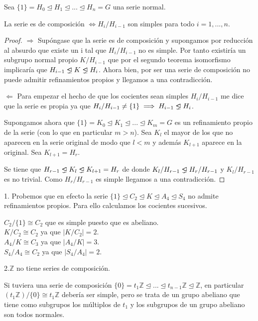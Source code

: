 \begin{nth}
Sea $\{1\} = H_0 \trianglelefteq H_1 \trianglelefteq ... \trianglelefteq H_n = G$ una serie normal. 

La serie es de composición $\iff H_i/H_{i-1}$ son simples para todo $i = 1,...,n$.
\end{nth}
\begin{proof}
$\Rightarrow$ Supóngase que la serie es de composición y supongamos por reducción al absurdo que existe un i tal que $H_i/H_{i-1}$ no es simple. Por tanto existiría un subgrupo normal propio $K/H_{i-1}$ que por el segundo teorema isomorfismo implicaría que $H_{i-1} \propernormal K \propernormal H_{i}$. Ahora bien, por ser una serie de composición no puede admitir refinamientos propios y llegamos a una contradicción.

$\Leftarrow$ Para empezar el hecho de que los cocientes sean simples $H_i/H_{i-1}$ me dice que la serie es propia ya que $H_i/H_{i-1} \neq \{1\} \implies H_{i-1} \propernormal H_i$.

Supongamos ahora que $\{1\} = K_0 \trianglelefteq K_1 \trianglelefteq ... \trianglelefteq K_m = G$ es un refinamiento propio de la serie (con lo que en particular $m > n$). Sea $K_l$ el mayor de los que no aparecen en la serie original de modo que $l < m$ y además $K_{l+1}$ aparece en la original. Sea $K_{l+1} = H_r$. 

Se tiene que $H_{r-1} \propernormal K_l \propernormal K_{l+1} = H_r$ de donde $K_l/H_{r-1} \propernormal H_r/H_{r-1}$ y $K_l/H_{r-1}$ es no trivial. Como $H_r/H_{r-1}$ es simple llegamos a una contradicción.
\end{proof}

\begin{ejemplo}
1. Probemos que en efecto la serie $\{1\} \trianglelefteq C_2 \trianglelefteq K \trianglelefteq A_4 \trianglelefteq S_4$ no admite refinamientos propios. Para ello calculamos los cocientes sucesivos. 

$C_2/\{1\} \cong C_2$ que es simple puesto que es abeliano.\\
$K/C_2 \cong C_2$ ya que $|K/C_2| = 2$.\\
$A_4/K \cong C_3$ ya que $|A_4/K| = 3$.\\
$S_4/A_4 \cong C_2$ ya que $|S_4/A_4| = 2$.
 
2.$\mathbb{Z}$ no tiene series de composición.

Si tuviera una serie de composición $\{0\} = t_1\mathbb{Z} \trianglelefteq ... \trianglelefteq t_{n-1}\mathbb{Z} \trianglelefteq \mathbb{Z}$, en particular $(t_1\mathbb{Z})/\{0\} \cong t_1\mathbb{Z}$ debería ser simple, pero se trata de un grupo abeliano que tiene como subgrupos los múltiplos de $t_1$ y los subgrupos de un grupo abeliano son todos normales.
\end{ejemplo}

